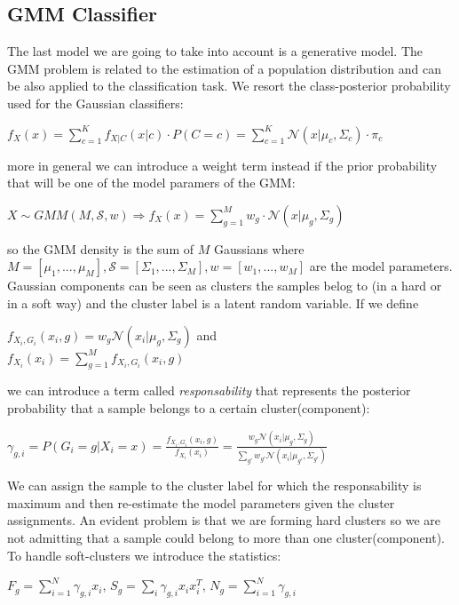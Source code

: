 \documentclass[10pt, a4paper, twocolumn]{article} %
\begin{document}
\subsection{GMM Classifier}
The last model we are going to take into account is a generative model. 
The GMM problem is related to the estimation of a population distribution and can be 
also applied to the classification task. We resort the class-posterior probability
used for the Gaussian classifiers:
\begin{center}
	$f_X(x) = \sum_{c=1}^K f_{X|C}(x|c) \cdot P(C=c) = \sum_{c=1}^K \mathcal{N}(x|\mu_c,\Sigma_c) \cdot \pi_c$
\end{center}
more in general we can introduce a weight term instead if the prior probability that will
be one of the model paramers of the GMM:
\begin{center}
	$X \sim GMM(M,\mathcal{S},w) \Rightarrow f_X(x) = \sum_{g=1}^M w_g \cdot \mathcal{N}(x|\mu_g,\Sigma_g)$
\end{center}
so the GMM density is the sum of $M$ Gaussians where 
$M=[\mu_1,...,\mu_M], \mathcal{S}=[\Sigma_1,...,\Sigma_M], w=[w_1,...,w_M]$ are the
model parameters. Gaussian components can be seen as clusters the samples belog to (in
a hard or in a soft way) and the cluster label is a latent random variable. If we define
\begin{center}
	$f_{X_i,G_i}(x_i,g)=w_g\mathcal{N}(x_i|\mu_g,\Sigma_g)$ and \\
	$f_{X_i}(x_i) = \sum_{g=1}^M f_{X_i,G_i}(x_i,g)$
\end{center}
we can introduce a term called \textit{responsability} that represents the posterior probability
that a sample belongs to a certain cluster(component):
\begin{center}
	$\gamma_{g,i} = P(G_i = g|X_i=x) = \frac{f_{X_i,G_i}(x_i,g)}{f_{X_i}(x_i)} = \frac{w_g\mathcal{N}(x_i|\mu_g,\Sigma_g)}{\sum_{g'} w_{g'}\mathcal{N}(x_i|\mu_{g'},\Sigma_{g'})}$
\end{center}
We can assign the sample to the cluster label for which the responsability is maximum and 
then re-estimate the model parameters given the cluster assignments. An evident
problem is that we are forming hard clusters so we are not admitting that a sample could
belong to more than one cluster(component). To handle soft-clusters we introduce the statistics:
\begin{center}
		$F_g=\sum_{i=1}^N \gamma_{g,i}x_i$, \;$S_g=\sum_{i}\gamma_{g,i}x_ix_i^T$, \;$N_g=\sum_{i=1}^N \gamma_{g,i}$
\end{center}
\end{document}
